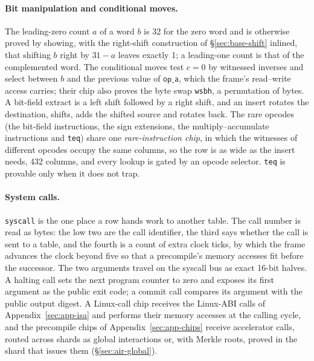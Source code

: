 \paragraph{Bit manipulation and conditional moves.}\label{sec:ext-bits} The leading-zero count $a$ of a word $b$ is 32 for the zero word and is otherwise proved by showing, with the right-shift construction of \S\ref{sec:base-shift} inlined, that shifting $b$ right by $31 - a$ leaves exactly 1; a leading-one count is that of the complemented word. The conditional moves test $c = 0$ by witnessed inverses and select between $b$ and the previous value of $\mathsf{op\_a}$, which the frame's read--write access carries; their chip also proves the byte swap \texttt{wsbh}, a permutation of bytes. A bit-field extract is a left shift followed by a right shift, and an insert rotates the destination, shifts, adds the shifted source and rotates back. The rare opcodes (the bit-field instructions, the sign extensions, the multiply--accumulate instructions and \texttt{teq}) share one \emph{rare-instruction chip}, in which the witnesses of different opcodes occupy the same columns, so the row is as wide as the insert needs, 432 columns, and every lookup is gated by an opcode selector. \texttt{teq} is provable only when it does not trap.

\paragraph{System calls.}\label{sec:ext-syscall} \texttt{syscall} is the one place a row hands work to another table. The call number is read as bytes: the low two are the call identifier, the third says whether the call is sent to a table, and the fourth is a count of extra clock ticks, by which the frame advances the clock beyond five so that a precompile's memory accesses fit before the successor. The two arguments travel on the syscall bus as exact 16-bit halves. A halting call sets the next program counter to zero and exposes its first argument as the public exit code; a commit call compares its argument with the public output digest. A Linux-call chip receives the Linux-ABI calls of Appendix~\ref{sec:app-isa} and performs their memory accesses at the calling cycle, and the precompile chips of Appendix~\ref{sec:app-chips} receive accelerator calls, routed across shards as global interactions or, with Merkle roots, proved in the shard that issues them (\S\ref{sec:air-global}).
